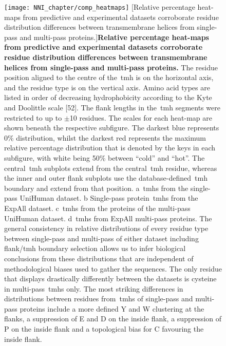 \begin{figure}[p]
\centering
\texttt{[image: NNI\_chapter/comp\_heatmaps]}
[Relative percentage heat-maps from predictive and experimental datasets corroborate residue distribution differences between transmembrane helices from single-pass and multi-pass proteins.]{\textbf{Relative percentage heat-maps from predictive and experimental datasets corroborate residue distribution differences between transmembrane helices from single-pass and multi-pass proteins.}
The residue position aligned to the centre of the~\gls{tmh} is on the horizontal axis, and the residue type is on the vertical axis.
Amino acid types are listed in order of decreasing hydrophobicity according to the Kyte and Doolittle scale [52].
The flank lengths in the~\gls{tmh} segments were restricted to up to $\pm$10 residues.
The scales for each heat-map are shown beneath the respective subfigure.
The darkest blue represents 0\% distribution, whilst the darkest red represents the maximum relative percentage distribution that is denoted by the keys in each subfigure, with white being 50\% between ``cold'' and ``hot''.
The central~\gls{tmh} subplots extend from the central~\gls{tmh} residue, whereas the inner and outer flank subplots use the database-defined~\gls{tmh} boundary and extend from that position.
a~\gls{tmh}s from the single-pass UniHuman dataset.
b Single-pass protein~\gls{tmh}s from the ExpAll dataset.
c~\gls{tmh}s from the proteins of the multi-pass UniHuman dataset.
d~\gls{tmh}s from ExpAll multi-pass proteins.
The general consistency in relative distributions of every residue type between single-pass and multi-pass of either dataset including flank/\gls{tmh} boundary selection allows us to infer biological conclusions from these distributions that are independent of methodological biases used to gather the sequences.
The only residue that displays drastically differently between the datasets is cysteine in multi-pass~\gls{tmh}s only.
The most striking differences in distributions between residues from~\gls{tmh}s of single-pass and multi-pass proteins include a more defined Y and W clustering at the flanks, a suppression of E and D on the inside flank, a suppression of P on the inside flank and a topological bias for C favouring the inside flank.}

\label{fig:comp_heatmaps}
\end{figure}

